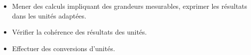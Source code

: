 \begin{prerequis}    
    \begin{itemize}        
        \item[\emoji{diamond-suit}] Mener des calculs impliquant des grandeurs mesurables, exprimer les résultats dans les unités adaptées.
        \item[\emoji{diamond-suit}] Vérifier la cohérence des résultats des unités.
        \item[\emoji{diamond-suit}] Effectuer des conversions d’unités.
    \end{itemize}
\end{prerequis}